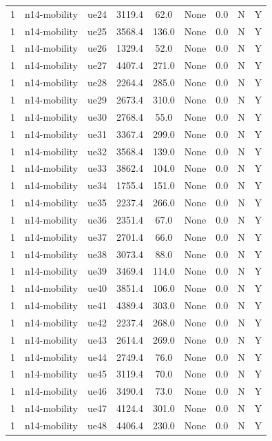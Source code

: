 \begin{table}[ht]
\begin{tabular}{|c|c|c|c|c|c|c|c|c|}
1 & n14-mobility & ue24 & 3119.4 & 62.0 & None & 0.0 & N & Y \\
1 & n14-mobility & ue25 & 3568.4 & 136.0 & None & 0.0 & N & Y \\
1 & n14-mobility & ue26 & 1329.4 & 52.0 & None & 0.0 & N & Y \\
1 & n14-mobility & ue27 & 4407.4 & 271.0 & None & 0.0 & N & Y \\
1 & n14-mobility & ue28 & 2264.4 & 285.0 & None & 0.0 & N & Y \\
1 & n14-mobility & ue29 & 2673.4 & 310.0 & None & 0.0 & N & Y \\
1 & n14-mobility & ue30 & 2768.4 & 55.0 & None & 0.0 & N & Y \\
1 & n14-mobility & ue31 & 3367.4 & 299.0 & None & 0.0 & N & Y \\
1 & n14-mobility & ue32 & 3568.4 & 139.0 & None & 0.0 & N & Y \\
1 & n14-mobility & ue33 & 3862.4 & 104.0 & None & 0.0 & N & Y \\
1 & n14-mobility & ue34 & 1755.4 & 151.0 & None & 0.0 & N & Y \\
1 & n14-mobility & ue35 & 2237.4 & 266.0 & None & 0.0 & N & Y \\
1 & n14-mobility & ue36 & 2351.4 & 67.0 & None & 0.0 & N & Y \\
1 & n14-mobility & ue37 & 2701.4 & 66.0 & None & 0.0 & N & Y \\
1 & n14-mobility & ue38 & 3073.4 & 88.0 & None & 0.0 & N & Y \\
1 & n14-mobility & ue39 & 3469.4 & 114.0 & None & 0.0 & N & Y \\
1 & n14-mobility & ue40 & 3851.4 & 106.0 & None & 0.0 & N & Y \\
1 & n14-mobility & ue41 & 4389.4 & 303.0 & None & 0.0 & N & Y \\
1 & n14-mobility & ue42 & 2237.4 & 268.0 & None & 0.0 & N & Y \\
1 & n14-mobility & ue43 & 2614.4 & 269.0 & None & 0.0 & N & Y \\
1 & n14-mobility & ue44 & 2749.4 & 76.0 & None & 0.0 & N & Y \\
1 & n14-mobility & ue45 & 3119.4 & 70.0 & None & 0.0 & N & Y \\
1 & n14-mobility & ue46 & 3490.4 & 73.0 & None & 0.0 & N & Y \\
1 & n14-mobility & ue47 & 4124.4 & 301.0 & None & 0.0 & N & Y \\
1 & n14-mobility & ue48 & 4406.4 & 230.0 & None & 0.0 & N & Y \\

\end{tabular}
\end{table}
